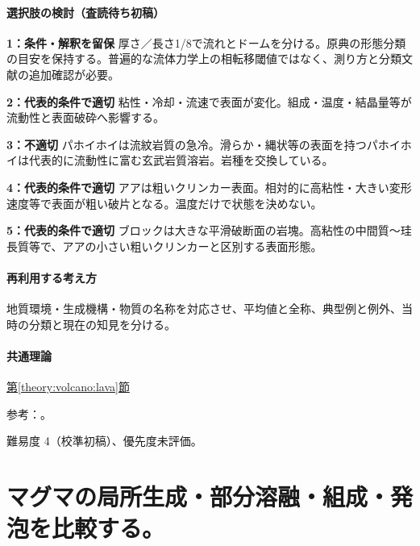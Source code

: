 \paragraph{選択肢の検討（査読待ち初稿）}\mbox{}\par

\noindent\textbf{1：条件・解釈を留保} 厚さ／長さ1/8で流れとドームを分ける。原典の形態分類の目安を保持する。普遍的な流体力学上の相転移閾値ではなく、測り方と分類文献の追加確認が必要。\par

\noindent\textbf{2：代表的条件で適切} 粘性・冷却・流速で表面が変化。組成・温度・結晶量等が流動性と表面破砕へ影響する。\par

\noindent\textbf{3：不適切} パホイホイは流紋岩質の急冷。滑らか・縄状等の表面を持つパホイホイは代表的に流動性に富む玄武岩質溶岩。岩種を交換している。\par

\noindent\textbf{4：代表的条件で適切} アアは粗いクリンカー表面。相対的に高粘性・大きい変形速度等で表面が粗い破片となる。温度だけで状態を決めない。\par

\noindent\textbf{5：代表的条件で適切} ブロックは大きな平滑破断面の岩塊。高粘性の中間質～珪長質等で、アアの小さい粗いクリンカーと区別する表面形態。\par

\paragraph{再利用する考え方} 地質環境・生成機構・物質の名称を対応させ、平均値と全称、典型例と例外、当時の分類と現在の知見を分ける。

\paragraph{共通理論} \hyperref[theory:volcano:lava]{第\ref*{theory:volcano:lava}節}

\par 参考：\cite{vol50_lava_ref,jma_magma1999}。

\par 難易度 4（校準初稿）、優先度未評価。

\section{マグマの局所生成・部分溶融・組成・発泡を比較する。}

